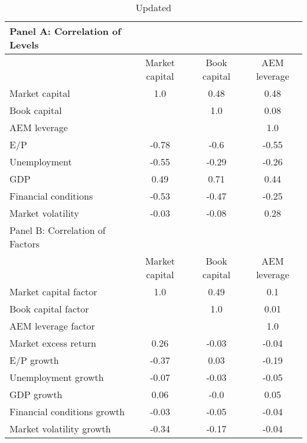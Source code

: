 
    \begin{table}[htbp]
    \centering
    \caption{\label{tab:correlation}Updated}
    \begin{adjustbox}{max width=\textwidth}
    \small
    \begin{tabular}{lccc}
        \toprule
        Panel A: Correlation of Levels \\
        \midrule
         & Market capital & Book capital & AEM leverage \\
        \midrule
        Market capital & 1.0 & 0.48 & 0.48 \\
Book capital &  & 1.0 & 0.08 \\
AEM leverage &  &  & 1.0 \\
E/P & -0.78 & -0.6 & -0.55 \\
Unemployment & -0.55 & -0.29 & -0.26 \\
GDP & 0.49 & 0.71 & 0.44 \\
Financial conditions & -0.53 & -0.47 & -0.25 \\
Market volatility & -0.03 & -0.08 & 0.28 \\
        \midrule
        Panel B: Correlation of Factors \\
        \midrule
         & Market capital & Book capital & AEM leverage \\
        \midrule
        Market capital factor & 1.0 & 0.49 & 0.1 \\
Book capital factor &  & 1.0 & 0.01 \\
AEM leverage factor &  &  & 1.0 \\
Market excess return & 0.26 & -0.03 & -0.04 \\
E/P growth & -0.37 & 0.03 & -0.19 \\
Unemployment growth & -0.07 & -0.03 & -0.05 \\
GDP growth & 0.06 & -0.0 & 0.05 \\
Financial conditions growth & -0.03 & -0.05 & -0.04 \\
Market volatility growth & -0.34 & -0.17 & -0.04 \\
        \bottomrule
    \end{tabular}
    \end{adjustbox}
    \end{table}
    